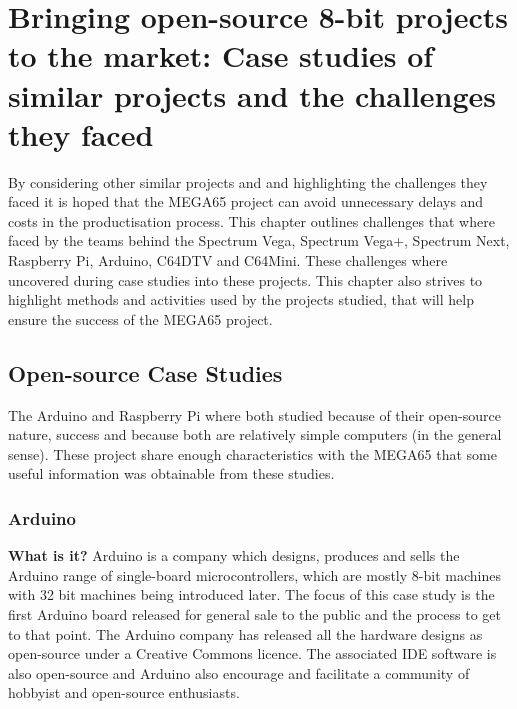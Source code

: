 
\chapter{Bringing open-source 8-bit projects to the market: Case studies of similar projects and the challenges they faced}
\label{Chapter3}
By considering other similar projects and and highlighting the challenges they faced it is hoped that the MEGA65 project can avoid unnecessary delays and costs in the productisation process. This chapter outlines challenges that where faced by the teams behind the Spectrum Vega, Spectrum Vega+, Spectrum Next, Raspberry Pi, Arduino, C64DTV and C64Mini. These challenges where uncovered during case studies into these projects. This chapter also strives to highlight methods and activities used by the projects studied, that will help ensure the success of the MEGA65 project. 

\section{Open-source Case Studies}
The Arduino and Raspberry Pi where both studied because of their open-source nature, success and because both are relatively simple computers (in the general sense). These project share enough characteristics with the MEGA65 that some useful information was obtainable from these studies.

\subsection{Arduino}
\textbf{What is it?}
Arduino is a company which designs, produces and sells the Arduino range of single-board microcontrollers, which are mostly 8-bit machines with 32 bit machines being introduced later. The focus of this case study is the first Arduino board released for general sale to the public and the process to get to that point. The Arduino company has released all the hardware designs as open-source under a Creative Commons licence. The associated IDE software is also open-source and Arduino also encourage and facilitate a community of hobbyist and open-source enthusiasts. 

